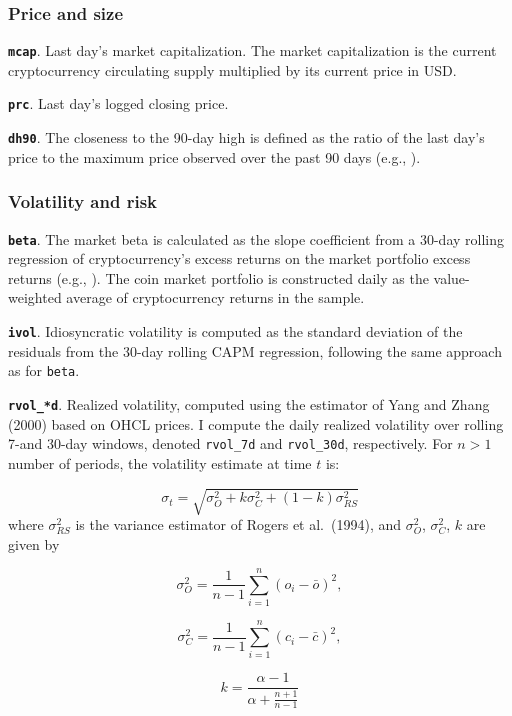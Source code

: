 \documentclass[
  12pt,
  a4paper,
  openany]{scrbook}
\begin{document}
\subsubsection{Price and size}\label{price-and-size}

\textbf{\texttt{mcap}}. Last day's market capitalization. The market
capitalization is the current cryptocurrency circulating supply
multiplied by its current price in USD.

\textbf{\texttt{prc}}. Last day's logged closing price.

\textbf{\texttt{dh90}}. The closeness to the 90-day high is defined as
the ratio of the last day's price to the maximum price observed over the
past 90 days (e.g., ).

\subsubsection{Volatility and risk}\label{volatility-and-risk}

\textbf{\texttt{beta}}. The market beta is calculated as the slope
coefficient from a 30-day rolling regression of cryptocurrency's excess
returns on the market portfolio excess returns (e.g.,
).
The coin market portfolio is constructed daily as the value-weighted
average of cryptocurrency returns in the sample.

\textbf{\texttt{ivol}}. Idiosyncratic volatility is computed as the
standard deviation of the residuals from the 30-day rolling CAPM
regression, following the same approach as for \texttt{beta}.

\textbf{\texttt{rvol\_*d}}. Realized volatility, computed using the
estimator of Yang and Zhang (2000) based on OHCL prices. I compute the
daily realized volatility over rolling 7-and 30-day windows, denoted
\texttt{rvol\_7d} and \texttt{rvol\_30d}, respectively. For \(n > 1\)
number of periods, the volatility estimate at time \(t\) is:

\[
\sigma_t = \sqrt{\sigma^2_O + k\sigma^2_C + (1 - k)\sigma^2_{RS}}
\] where \(\sigma^2_{RS}\) is the variance estimator of Rogers et
al.~(1994), and \(\sigma^2_O\), \(\sigma^2_C\), \(k\) are given by

\[
\sigma^2_O = \frac{1}{n-1}\sum\limits_{i=1}^n(o_i - \bar o)^2,
\]

\[
\sigma^2_C = \frac{1}{n-1}\sum\limits_{i=1}^n(c_i - \bar c)^2,
\]

\[
k = \frac{\alpha -1}{\alpha + \frac{n+1}{n-1}}
\]
\end{document}
